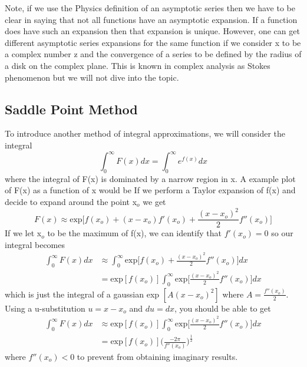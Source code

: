 \documentclass{article}
\newcommand{\be}{\begin{equation}}
\newcommand{\ee}{\end{equation}}
\begin{document}
Note, if we use the Physics definition of an asymptotic series then we have to be clear in saying that not all functions have an asymptotic expansion.
If a function does have such an expansion then that expansion is unique.
However, one can get different asymptotic series expansions for the same function if we consider x to be a complex number z and the convergence of a series to be defined by the radius of a disk on the complex plane.
This is known in complex analysis as Stokes phenomenon but we will not dive into the topic.

\subsection*{Saddle Point Method}
To introduce another method of integral approximations, we will consider the integral
\be
  \int_0^{\infty} F(x) dx = \int_0^{\infty} e^{f(x)} dx
\ee
where the integral of F(x) is dominated by a narrow region in x.
A example plot of F(x) as a function of x would be
If we perform a Taylor expansion of f(x) and decide to expand around the point x$_o$ we get
\be
  F(x) \approx \text{exp} \Big[ f(x_o) + (x - x_o)f'(x_o) + \frac{(x - x_o)^2}{2}f''(x_o) \Big]
\ee
If we let x$_o$ to be the maximum of f(x), we can identify that $f'(x_o) = 0$ so our integral becomes
\be
  \begin{split}
    \int_0^{\infty} F(x) dx &\approx \int_0^{\infty} \text{exp} \big[ f(x_o) + \frac{(x - x_o)^2}{2}f''(x_o) \Big] dx \\
    &= \text{exp}[f(x_o)] \int_0^{\infty} \text{exp} \Big[ \frac{(x - x_o)^2}{2}f''(x_o) \Big] dx
  \end{split}
\ee
which is just the integral of a gaussian exp $[A(x-x_o)^2]$ where $A = \frac{f''(x_o)}{2}$.
Using a u-substitution $u = x - x_o$ and $du = dx$, you should be able to get
\be
  \begin{split}
      \int_0^{\infty} F(x) dx &\approx \text{exp}[f(x_o)] \int_0^{\infty} \text{exp} \Big[ \frac{(x - x_o)^2}{2}f''(x_o) \Big] dx \\
      &= \text{exp}[f(x_o)] \Big( \frac{-2 \pi}{f''(x_o)} \Big) ^{\frac{1}{2}}
  \end{split}
\ee
where $f''(x_o) < 0$ to prevent from obtaining imaginary results.
\end{document}
